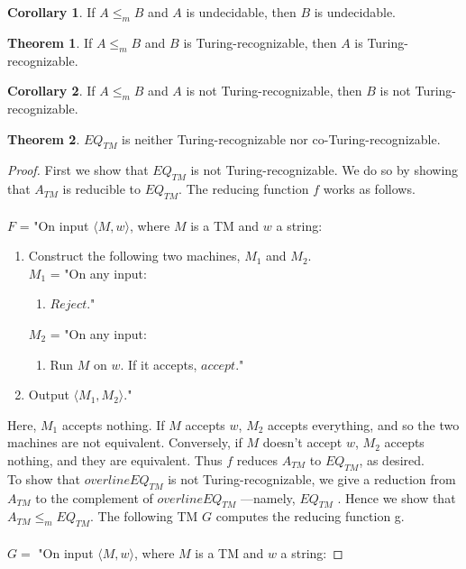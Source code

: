 \documentclass[11pt]{article}
\theoremstyle{definition}
\newtheorem{thm}{Theorem}[section]
\newtheorem{cor}{Corollary}[thm]
\begin{document}
\begin{cor}
    If $A\leq_m B$ and $A$ is undecidable, then $B$ is undecidable. 
\end{cor}
\begin{thm}
    If $A\leq_m B$ and $B$ is Turing-recognizable, then $A$ is Turing-recognizable. 
\end{thm}
\begin{cor}
    If $A\leq_m B$ and $A$ is not Turing-recognizable, then $B$ is not Turing-recognizable. 
\end{cor}
\begin{thm}
    $EQ_{TM}$ is neither Turing-recognizable nor co-Turing-recognizable. 
\end{thm}
\begin{proof}
First we show that $EQ_{TM}$ is not Turing-recognizable. We do so by showing that $A_{TM}$ is reducible to $EQ_{TM}$. The reducing function $f$ works as follows.\\\\
$F$ = "On input $\langle M,w\rangle$, where $M$ is a TM and $w$ a string:
\renewcommand{\labelenumii}{\arabic{enumii}.}
\begin{enumerate}
    \item Construct the following two machines, $M_1$ and $M_2$.\\
    $M_1$ = "On any input:
    \begin{enumerate}
        \item $Reject$."
    \end{enumerate}
    $M_2$ = "On any input:
        \begin{enumerate}
        \item Run $M$ on $w$. If it accepts, $accept$."
    \end{enumerate}
\item Output $\langle M_1,M_2\rangle$."
\end{enumerate}
Here, $M_1$ accepts nothing. If $M$ accepts $w$, $M_2$ accepts everything, and so the two machines are not equivalent. Conversely, if $M$ doesn't accept $w$, $M_2$ accepts nothing, and they are equivalent. Thus $f$ reduces $A_{TM}$ to $EQ_{TM}$, as desired.\\
To show that $overline{EQ_{TM}}$ is not Turing-recognizable, we give a reduction from $A_{TM}$ to the complement of $overline{EQ_{TM}}$ —namely, $EQ_{TM}$ . Hence we show that $A_{TM}\leq_m EQ_{TM}$. The following TM $G$ computes the reducing function g.\\\\
$G =$ "On input $\langle M,w\rangle$, where $M$ is a TM and $w$ a string:

\end{proof}
\end{document}
